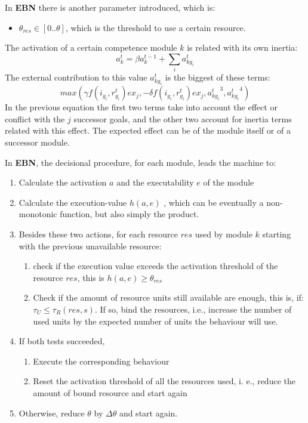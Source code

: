 \documentclass[
		twoside,openright,titlepage,numbers=noenddot,manychapters,
		headinclude,%
                footinclude=false,cleardoublepage=empty,
                BCOR=5mm,
		fontsize=11pt, %
                 enabledeprecatedfontcommands]{scrreprt}
\begin{document}
In \textbf{EBN} there is another parameter introduced, which is:
\begin{itemize}
\item $\theta_{res} \in [0..\theta]$, which is the threshold to use a certain resource.
\end{itemize}


The activation of a certain competence module $k$ is related with its own inertia:
\begin{equation}
a_k^t=\beta a_k^{t-1} + \sum_i a_{k g_i}^t
\end{equation}
The external contribution to this value $ a_{k g_i}^t$ is the biggest of these terms:
\begin{equation}
 max(\gamma  f(i_{g_i},r_{g_i}^t)ex_j,- \delta  f(i_{g_i},r_{g_i}^t)ex_j, {a_{k g_i}^t}^3,{a_{k g_i}^t}^4 )
\end{equation}
In the previous equation the first two terms take into account the effect or conflict with the $j$ successor goals, and the other two account for inertia terms related with this effect. The expected effect can be of the module itself or of a successor module.


In \textbf{EBN}, the decisional procedure, for each module, leads the machine to:
\begin{enumerate}
  \item Calculate the activation $a$ and the executability $e$ of the module
  \item Calculate the execution-value $h(a,e)$ , which can be eventually a non-monotonic function, but also simply the product.
  \item Besides these two actions, for each resource $res$ used by module $k$ starting with the previous unavailable resource:
    \begin{enumerate}
    \item	check if the execution value exceeds the activation threshold of the resource $res$, this is $h(a,e) \geq \theta_{res}$
    \item Check if the amount of resource units still available are enough, this is, if: $\tau_U \leq \tau_R(res,s)$. If so, bind the resources, i.e., increase the number of used units by the expected number of units the behaviour will use.
    \end{enumerate}

  \item 	If both tests succeeded,
  \begin{enumerate}
    \item	Execute the corresponding behaviour
    \item	Reset the activation threshold of all the resources used, i. e., reduce the amount of bound resource and start again
  \end{enumerate}
  \item Otherwise, reduce $\theta$ by $\Delta\theta$ and start again.
\end{enumerate}
\end{document}
